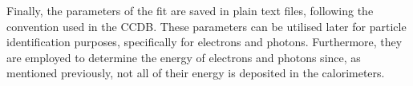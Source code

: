     Finally, the parameters of the fit are saved in plain text files, following the convention used in the CCDB.
    These parameters can be utilised later for particle identification purposes, specifically for electrons and photons.
    Furthermore, they are employed to determine the energy of electrons and photons since, as mentioned previously, not all of their energy is deposited in the calorimeters.
